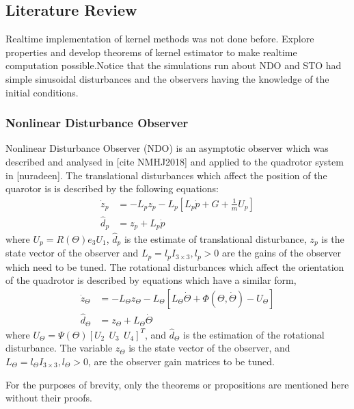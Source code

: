 \documentclass{article}
\begin{document}
\subsection{Literature Review}
Realtime implementation of kernel methods was not done before. Explore properties and develop theorems of kernel estimator to make realtime computation possible.Notice that the simulations run about NDO and STO had simple sinusoidal disturbances and the observers having the knowledge of the initial conditions. 

\subsubsection{Nonlinear Disturbance Observer}
Nonlinear Disturbance Observer (NDO) is an asymptotic observer which was described and analysed in [cite NMHJ2018] and applied to the quadrotor system in [nuradeen]. The translational disturbances which affect the position of the quarotor is is described by the following equations: 
\begin{equation}
\begin{split}
\label{eq5:a}
\dot{z}_p &= -L_pz_p - L_p[L_p\dot{p}+G+\frac{1}{m}U_p ]\\
\hat{d}_p&=z_p + L_p\dot{p}
\end{split}
\end{equation}
where $U_p=R(\Theta) e_3 U_1$, $\widehat{d}_p$ is the estimate of translational disturbance,  $z_p$ is the state vector of the observer and $L_p=l_p I_{3 \times 3}, l_p >0$ are the gains of the observer which need to be tuned. 
The rotational disturbances which affect the orientation of the quadrotor is described by equations which have a similar form, 
\begin{equation}
\begin{split}
\label{eq5:b}
\dot{z}_\Theta &= -L_\Theta z_\Theta - L_\Theta[L_\Theta\dot{\Theta}+\Phi(\Theta,\dot{\Theta}) - U_\Theta] \\
\hat{d}_\Theta&=z_\Theta + L_\Theta\dot{\Theta}
\end{split}
\end{equation}
where $U_\Theta=\Psi(\Theta)[U_2\ \ U_3\ \ U_4]^T$, and $\widehat{d}_\Theta$ is the estimation of the rotational disturbance. The variable $z_\Theta$ is the state vector of the observer, and $L_\Theta=l_\Theta I_{3 \times 3}, l_\Theta >0$, are the observer gain matrices to be tuned.

For the purposes of brevity, only the theorems or propositions are mentioned here without their proofs. 
\end{document}

